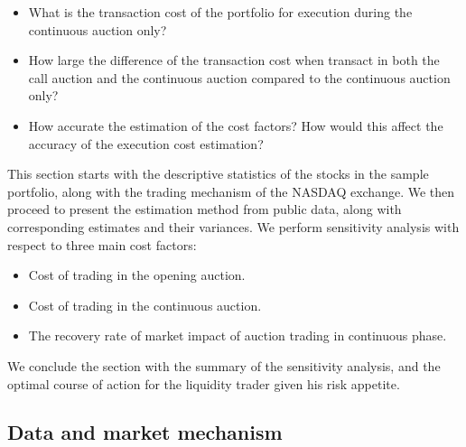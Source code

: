 \begin{itemize}
  \item What is the transaction cost of the portfolio for execution during the continuous auction only?
  \item How large the difference of the transaction cost when transact in both the call auction and the continuous auction compared to the continuous auction only?
  \item How accurate the estimation of the cost factors? How would this affect the accuracy of the execution cost estimation?
\end{itemize}

This section starts with the descriptive statistics of the stocks in the sample portfolio, along with the trading mechanism of the NASDAQ exchange. We then proceed to present the estimation method from public data, along with corresponding estimates and their variances. We perform sensitivity analysis with respect to three main cost factors:
\begin{itemize}
  \item Cost of trading in the opening auction.
  \item Cost of trading in the continuous auction.
  \item The recovery rate of market impact of auction trading in continuous phase.
\end{itemize}

We conclude the section with the summary of the sensitivity analysis, and the optimal course of action for the liquidity trader given his risk appetite.

\subsection{Data and market mechanism}

